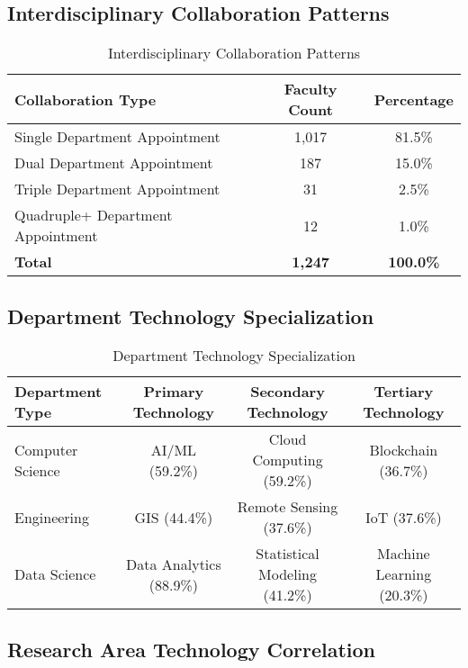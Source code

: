 \documentclass[12pt]{article}
\begin{document}
\subsection{Interdisciplinary Collaboration Patterns}

\begin{table}[h]
\centering
\caption{Interdisciplinary Collaboration Patterns}
\label{tab:collaboration_patterns}
\begin{tabular}{lcc}
\toprule
\textbf{Collaboration Type} & \textbf{Faculty Count} & \textbf{Percentage} \\
\midrule
Single Department Appointment & 1,017 & 81.5\% \\
Dual Department Appointment & 187 & 15.0\% \\
Triple Department Appointment & 31 & 2.5\% \\
Quadruple+ Department Appointment & 12 & 1.0\% \\
\midrule
\textbf{Total} & \textbf{1,247} & \textbf{100.0\%} \\
\bottomrule
\end{tabular}
\end{table}

\subsection{Department Technology Specialization}

\begin{table}[h]
\centering
\caption{Department Technology Specialization}
\label{tab:dept_tech_specialization}
\begin{tabular}{lccc}
\toprule
\textbf{Department Type} & \textbf{Primary Technology} & \textbf{Secondary Technology} & \textbf{Tertiary Technology} \\
\midrule
Computer Science & AI/ML (59.2\%) & Cloud Computing (59.2\%) & Blockchain (36.7\%) \\
Engineering & GIS (44.4\%) & Remote Sensing (37.6\%) & IoT (37.6\%) \\
Data Science & Data Analytics (88.9\%) & Statistical Modeling (41.2\%) & Machine Learning (20.3\%) \\
\bottomrule
\end{tabular}
\end{table}

\subsection{Research Area Technology Correlation}
\end{document}
